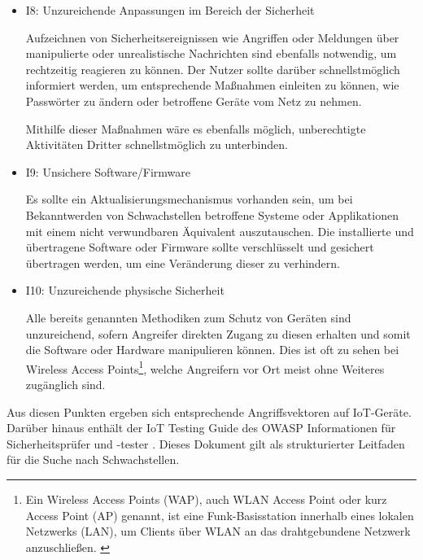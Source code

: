 \begin{itemize}
            \item I8: Unzureichende Anpassungen im Bereich der Sicherheit
            
            Aufzeichnen von Sicherheitsereignissen wie Angriffen oder Meldungen über manipulierte oder unrealistische Nachrichten sind ebenfalls notwendig, um rechtzeitig reagieren zu können. Der Nutzer sollte darüber schnellstmöglich informiert werden, um entsprechende Maßnahmen einleiten zu können, wie Passwörter zu ändern oder betroffene Geräte vom Netz zu nehmen.
            
            Mithilfe dieser Maßnahmen wäre es ebenfalls möglich, unberechtigte Aktivitäten Dritter schnellstmöglich zu unterbinden.
            
            \item I9: Unsichere Software/Firmware
            
            Es sollte ein Aktualisierungsmechanismus vorhanden sein, um bei Bekanntwerden von Schwachstellen betroffene Systeme oder Applikationen mit einem nicht verwundbaren Äquivalent auszutauschen. 
            Die installierte und übertragene Software oder Firmware sollte verschlüsselt und gesichert übertragen werden, um eine Veränderung dieser zu verhindern.
            
            \item I10: Unzureichende physische Sicherheit
            
            Alle bereits genannten Methodiken zum Schutz von Geräten sind unzureichend, sofern Angreifer direkten Zugang zu diesen erhalten und somit die Software oder Hardware manipulieren können. Dies ist oft zu sehen bei Wireless Access Points\footnote{\glqq Ein Wireless Access Points (WAP), auch WLAN Access Point oder kurz Access Point (AP) genannt, ist eine Funk-Basisstation innerhalb eines lokalen Netzwerks (LAN), um Clients über WLAN an das drahtgebundene Netzwerk anzuschließen.\grqq{} \cite{elektronik_kompendium_2018}}, welche Angreifern vor Ort meist ohne Weiteres zugänglich sind.
        \end{itemize}
        
        Aus diesen Punkten ergeben sich entsprechende Angriffsvektoren auf \ac{IoT}-Geräte. Darüber hinaus enthält der \glqq IoT Testing Guide\grqq{} des \ac{OWASP} Informationen für Sicherheitsprüfer und -tester \cite{smith_2016}. Dieses Dokument gilt als strukturierter Leitfaden für die Suche nach Schwachstellen.
        
